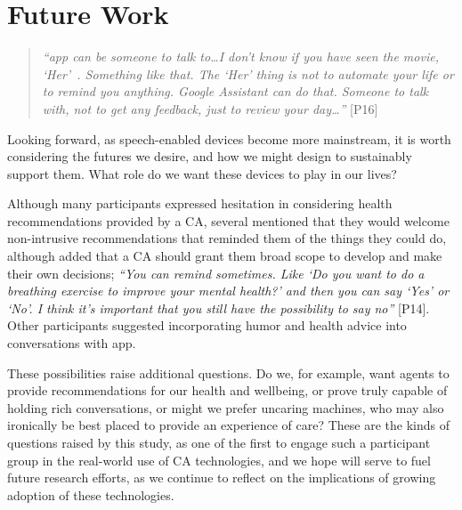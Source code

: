 \section{Future Work}


        \begin{quote}
        \vspace{2mm}
            \textit{``\acl{app} can be someone to talk to\ldots I don't know if you have seen the movie, `Her'~\cite{spike2014her}. Something like that. The `Her' thing is not to automate your life or to remind you anything. Google Assistant can do that. Someone to talk with, not to get any feedback, just to review your day\ldots''} [P16]
        \vspace{2mm}
        \end{quote} 
    
        Looking forward, as speech-enabled devices become more mainstream, it is worth considering the futures we desire, and how we might design to sustainably support them. What role do we want these devices to play in our lives? 
        
        Although many participants expressed hesitation in considering health recommendations provided by a \ac{CA}, several mentioned that they would welcome non-intrusive recommendations that reminded them of the things they could do, although added that a \ac{CA} should grant them broad scope to develop and make their own decisions; \textit{``You can remind sometimes. Like `Do you want to do a breathing exercise to improve your mental health?' and then you can say `Yes' or `No'. I think it's important that you still have the possibility to say no''} [P14]. Other participants suggested incorporating humor and health advice into conversations with \acl{app}.
        
        These possibilities raise additional questions. Do we, for example, 
            want agents to provide recommendations for our health and wellbeing, or 
            prove truly capable of holding rich conversations, or 
            might we prefer uncaring machines, who may also ironically be best placed to provide an experience of care?
        These are the kinds of questions raised by this study, as one of the first to engage such a participant group in the real-world use of \ac{CA} technologies, and we hope will serve to fuel future research efforts, as we continue to reflect on the implications of growing adoption of these technologies.
    
    
    
    